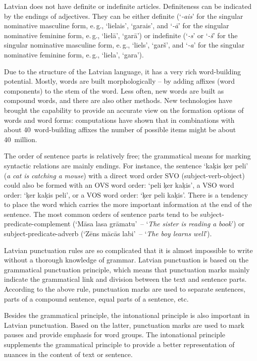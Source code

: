 \begin{multicols}{2}
Latvian does not have definite or indefinite articles.  Definiteness can be indicated by the endings of adjectives.  They can be either definite (`\textit{-ais}' for the singular nominative masculine form, e.\,g., `lielais', `garais', and `\textit{-ā}' for the singular nominative feminine form, e.\,g., `lielā', `garā') or indefinite (`\textit{-s}' or `\textit{-š}' for the singular nominative masculine form, e.\,g., `liels', `garš', and `\textit{-a}' for the singular nominative feminine form, e.\,g., `liela', `gara').

Due to the structure of the Latvian language, it has a very rich word-building potential.
Mostly, words are built morphologically -- by adding affixes (word components) to the stem of the word.
Less often, new words are built as compound words, and there are also other methods.
New technologies have brought the capability to provide an accurate view on the formation options of words and word forms: computations have shown that in combinations with about 40~word-building affixes the number of possible items might be about 40~million.


The order of sentence parts is relatively free; the grammatical means for marking syntactic relations are mainly endings.  For instance, the sentence `kaķis ķer peli' (\textit{a cat is catching a mouse}) with a direct word order SVO (subject-verb-object) could also be formed with an OVS word order: `peli ķer kaķis', a VSO word order: `ķer kaķis peli', or a VOS word order: `ķer peli kaķis'.  There is a tendency to place the word which carries the more important information at the end of the sentence.  The most common orders of sentence parts tend to be subject-predicate-complement (`Māsa lasa grāmatu'~-- `\textit{The sister is reading a book}') or subject-predicate-adverb (`Zēns mācās labi'~-- `\textit{The boy learns well}').

Latvian punctuation rules are so complicated that it is almost impossible to write without a thorough knowledge of grammar.  Latvian punctuation is based on the grammatical punctuation principle, which means that punctuation marks mainly indicate the grammatical link and division between the text and sentence parts.  According to the above rule, punctuation marks are used to separate sentences, parts of a compound sentence, equal parts of a sentence, etc.

Besides the grammatical principle, the intonational principle is also important in Latvian punctuation.
Based on the latter, punctuation marks are used to mark pauses and provide emphasis for word groups.
The intonational principle supplements the grammatical principle to provide a better representation of nuances in the content of text or sentence.


\end{multicols}
